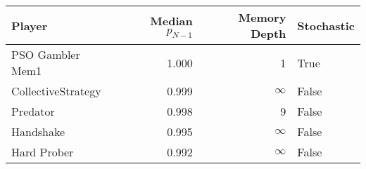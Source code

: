 \begin{tabular}{lrrl}
\toprule
             Player &  Median $p_{N-1}$ &  Memory Depth & Stochastic \\
\midrule
   PSO Gambler Mem1 &             1.000 &             1 &       True \\
 CollectiveStrategy &             0.999 &            \(\infty\) &      False \\
           Predator &             0.998 &             9 &      False \\
          Handshake &             0.995 &            \(\infty\) &      False \\
        Hard Prober &             0.992 &            \(\infty\) &      False \\
\bottomrule
\end{tabular}
